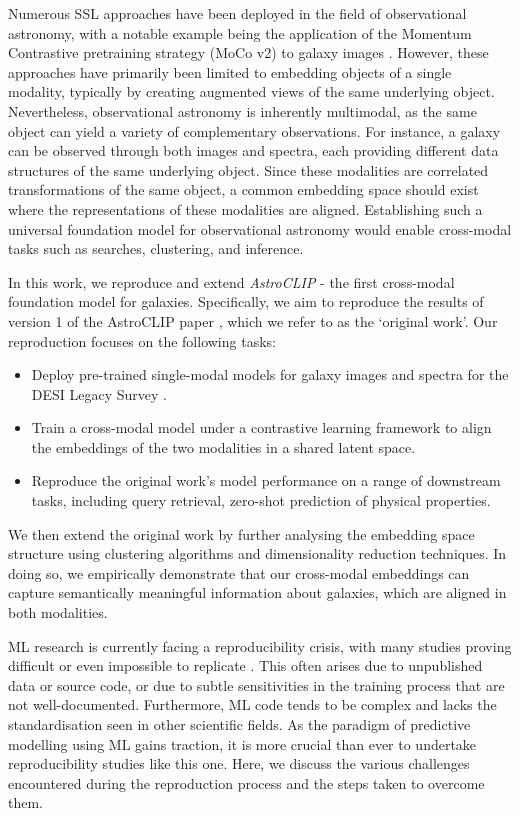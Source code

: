 \documentclass[a4paper,12pt]{article}
\begin{document}
Numerous SSL approaches have been deployed in the field of observational astronomy, with a notable example being the application of the Momentum Contrastive pretraining strategy (MoCo v2) to galaxy images \cite{stein}. However, these approaches have primarily been limited to embedding objects of a single modality, typically by creating augmented views of the same underlying object. Nevertheless, observational astronomy is inherently multimodal, as the same object can yield a variety of complementary observations. For instance, a galaxy can be observed through both images and spectra, each providing different data structures of the same underlying object. Since these modalities are correlated transformations of the same object, a common embedding space should exist where the representations of these modalities are aligned. Establishing such a universal foundation model for observational astronomy would enable cross-modal tasks such as searches, clustering, and inference.

In this work, we reproduce and extend \emph{AstroCLIP} - the first cross-modal foundation model for galaxies. Specifically, we aim to reproduce the results of version 1 of the AstroCLIP paper \cite{astroclip}, which we refer to as the `original work'. Our reproduction focuses on the following tasks:
\begin{itemize}
    \item Deploy pre-trained single-modal models for galaxy images and spectra for the DESI Legacy Survey \cite{DESI}.
    \item Train a cross-modal model under a contrastive learning framework to align the embeddings of the two modalities in a shared latent space.
    \item Reproduce the original work's model performance on a range of downstream tasks, including query retrieval, zero-shot prediction of physical properties.
\end{itemize}
We then extend the original work by further analysing the embedding space structure using clustering algorithms and dimensionality reduction techniques. In doing so, we empirically demonstrate that our cross-modal embeddings can capture semantically meaningful information about galaxies, which are aligned in both modalities.

ML research is currently facing a reproducibility crisis, with many studies proving difficult or even impossible to replicate \cite{kapoor2023leakage}. This often arises due to unpublished data or source code, or due to subtle sensitivities in the training process that are not well-documented. Furthermore, ML code tends to be complex and lacks the standardisation seen in other scientific fields. As the paradigm of predictive modelling using ML gains traction, it is more crucial than ever to undertake reproducibility studies like this one. Here, we discuss the various challenges encountered during the reproduction process and the steps taken to overcome them.
\end{document}

